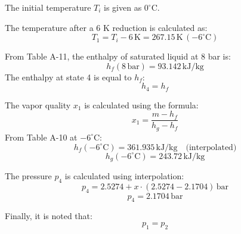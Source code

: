 The initial temperature \( T_i \) is given as \( 0^\circ\text{C} \).  

The temperature after a 6 K reduction is calculated as:  
\[
T_1 = T_i - 6 \, \text{K} = 267.15 \, \text{K} \, (-6^\circ\text{C})
\]  

From Table A-11, the enthalpy of saturated liquid at 8 bar is:  
\[
h_f(8 \, \text{bar}) = 93.142 \, \text{kJ/kg}
\]  
The enthalpy at state 4 is equal to \( h_f \):  
\[
h_4 = h_f
\]  

The vapor quality \( x_1 \) is calculated using the formula:  
\[
x_1 = \frac{m - h_f}{h_g - h_f}
\]  
From Table A-10 at \( -6^\circ\text{C} \):  
\[
h_f(-6^\circ\text{C}) = 361.935 \, \text{kJ/kg} \quad \text{(interpolated)}
\]  
\[
h_g(-6^\circ\text{C}) = 243.72 \, \text{kJ/kg}
\]  

The pressure \( p_4 \) is calculated using interpolation:  
\[
p_4 = 2.5274 + x \cdot (2.5274 - 2.1704) \, \text{bar}
\]  
\[
p_4 = 2.1704 \, \text{bar}
\]  

Finally, it is noted that:  
\[
p_1 = p_2
\]
